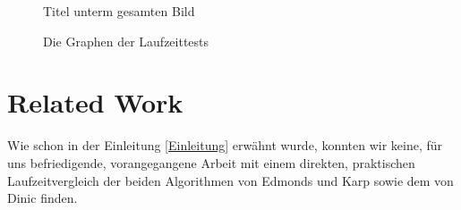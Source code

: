 \documentclass[a4paper]{llncs}
\begin{document}
\begin{figure}
\label{fig:testgraph2}
\caption{Titel unterm gesamten Bild} 
\end{figure}

\begin{figure}[H]
\label{fig:testgraph3}
\caption{Die Graphen der Laufzeittests} 
\end{figure}


\section{Related Work}
\label{Related Work}
Wie schon in der Einleitung \ref{Einleitung} erwähnt wurde, konnten wir keine, für uns befriedigende, vorangegangene Arbeit mit einem direkten, praktischen Laufzeitvergleich der beiden Algorithmen von Edmonds und Karp sowie dem von Dinic finden.
\end{document}

